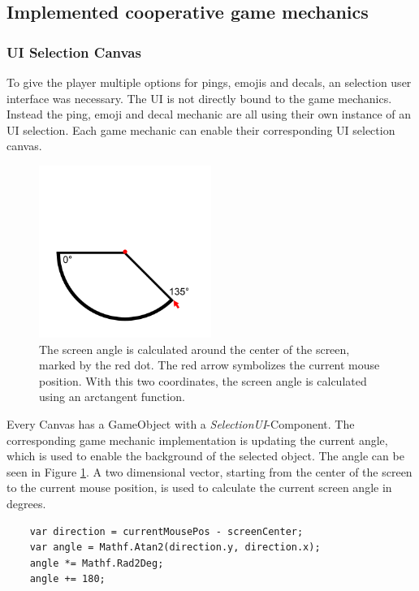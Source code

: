 \subsection{Implemented cooperative game mechanics}
\label{section:Implemented cooperative game mechanics}

\subsubsection{UI Selection Canvas}

To give the player multiple options for pings, emojis and decals, an selection user interface was necessary. The UI is not directly bound to the game mechanics. Instead the ping, emoji and decal mechanic are all using their own instance of an UI selection.
Each game mechanic can enable their corresponding UI selection canvas.

\begin{figure}
    \centering
    \includegraphics[width=0.5\textwidth]{images/angle_calculation.png}
    \caption{The screen angle is calculated around the center of the screen, marked by the red dot. The red arrow symbolizes the current mouse position. With this two coordinates, the screen angle is calculated using an arctangent function.}
    \label{fig:angle calculation}
\end{figure}

Every Canvas has a GameObject with a \textit{SelectionUI}-Component. The corresponding game mechanic implementation is updating the current angle, which is used to enable the background of the selected object. The angle can be seen in Figure \ref{fig:angle calculation}. A two dimensional vector, starting from the center of the screen to the current mouse position, is used to calculate the current screen angle in degrees.

\begin{verbatim}
    var direction = currentMousePos - screenCenter;
    var angle = Mathf.Atan2(direction.y, direction.x);
    angle *= Mathf.Rad2Deg;
    angle += 180;
\end{verbatim}

